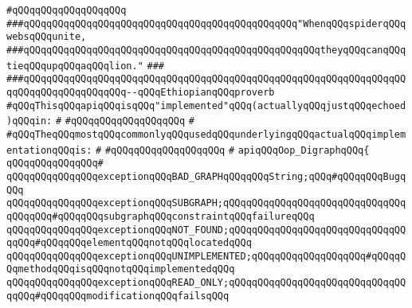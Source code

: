 \verb|#qQQqqQQqqQQqqQQqqQQq|\newline
\newline
\newline
\verb|###qQQqqQQqqQQqqQQqqQQqqQQqqQQqqQQqqQQqqQQqqQQqqQQq"WhenqQQqspiderqQQqwebsqQQqunite,|\newline
\verb|###qQQqqQQqqQQqqQQqqQQqqQQqqQQqqQQqqQQqqQQqqQQqqQQqqQQqtheyqQQqcanqQQqtieqQQqupqQQqaqQQqlion."|\newline
\verb|###|\newline
\verb|###qQQqqQQqqQQqqQQqqQQqqQQqqQQqqQQqqQQqqQQqqQQqqQQqqQQqqQQqqQQqqQQqqQQqqQQqqQQqqQQqqQQqqQQq--qQQqEthiopianqQQqproverb|\newline
\newline
\newline
\verb|#qQQqThisqQQqapiqQQqisqQQq"implemented"qQQq(actuallyqQQqjustqQQqechoed)qQQqin:|\newline
\verb|#|\newline
\verb|#qQQqqQQqqQQqqQQqqQQq|\newline
\verb|#|\newline
\verb|#qQQqTheqQQqmostqQQqcommonlyqQQqusedqQQqunderlyingqQQqactualqQQqimplementationqQQqis:|\newline
\verb|#|\newline
\verb|#qQQqqQQqqQQqqQQqqQQq|\newline
\verb|#|\newline
\verb|apiqQQqOop_DigraphqQQq{|\newline
\verb|qQQqqQQqqQQqqQQq#|\newline
\verb|qQQqqQQqqQQqqQQqexceptionqQQqBAD_GRAPHqQQqqQQqString;qQQq#qQQqqQQqBugqQQq|\newline
\verb|qQQqqQQqqQQqqQQqexceptionqQQqSUBGRAPH;qQQqqQQqqQQqqQQqqQQqqQQqqQQqqQQqqQQqqQQq#qQQqqQQqsubgraphqQQqconstraintqQQqfailureqQQq|\newline
\verb|qQQqqQQqqQQqqQQqexceptionqQQqNOT_FOUND;qQQqqQQqqQQqqQQqqQQqqQQqqQQqqQQqqQQq#qQQqqQQqelementqQQqnotqQQqlocatedqQQq|\newline
\verb|qQQqqQQqqQQqqQQqexceptionqQQqUNIMPLEMENTED;qQQqqQQqqQQqqQQqqQQq#qQQqqQQqmethodqQQqisqQQqnotqQQqimplementedqQQq|\newline
\verb|qQQqqQQqqQQqqQQqexceptionqQQqREAD_ONLY;qQQqqQQqqQQqqQQqqQQqqQQqqQQqqQQqqQQq#qQQqqQQqmodificationqQQqfailsqQQq|\newline
